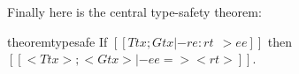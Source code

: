 Finally here is the central type-safety theorem:

\begin{restatable}{theorem}{typesafe}
  If $[[ Ttx ; Gtx |- re : rt ~~> ee ]]$ then $[[ < Ttx > ; < Gtx > |-  ee => < rt >  ]]$.
\end{restatable}





